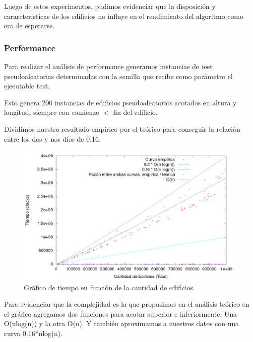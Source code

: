 Luego de estos experimentos, pudimos evidenciar que la disposición y cararcteristicas de los edificios no influye en el rendimiento del algoritmo como era de esperarse.


\subsubsection*{Performance}

Para realizar el análisis de performance generamos instancias de test pseudoaleatorias determinadas con la semilla que recibe como parámetro el ejecutable test.

Esto genera 200 instancias de edificios pseudoaleatorios acotados en altura y longitud, siempre con comienzo $<$ fin del edificio.

Dividimos nuestro resultado empírico por el teórico para conseguir la relación entre los dos y nos dios de 0.16.

\begin{figure}[H]
\begin{center}
\includegraphics[scale=0.35]{./imagenes/ej2_chartRendimiento.png}
\caption{Gr\'afico de tiempo en funci\'on de la cantidad de edificios.}
\end{center}
\end{figure}

Para evidenciar que la complejidad es la que propusimos en el análisis teórico en el gráfico agregamos dos funciones para acotar superior e inferiormente. Una O(nlog(n)) y la otra O(n). Y también aproximamos a nuestros datos con una curva 0.16*nlog(n).


